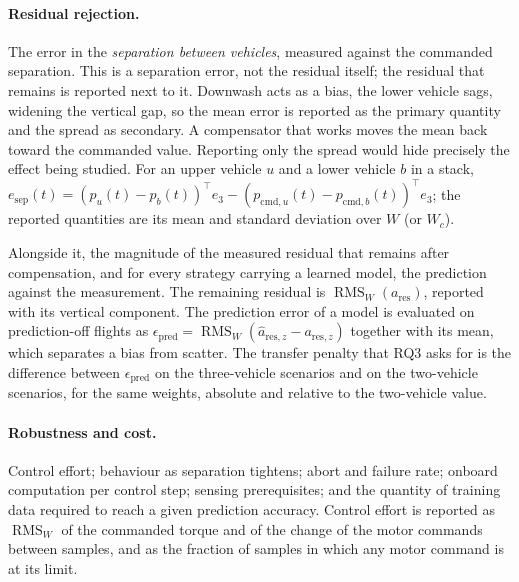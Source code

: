 \paragraph{Residual rejection.} The error in the \emph{separation between vehicles}, measured
against the commanded separation. This is a separation error, not the residual itself; the residual
that remains is reported next to it. Downwash acts as a bias, the lower vehicle sags, widening the
vertical gap, so the mean error is reported as the primary quantity and the spread as secondary. A
compensator that works moves the mean back toward the commanded value. Reporting only the spread
would hide precisely the effect being studied.
For an upper vehicle $u$ and a lower vehicle $b$ in a stack,
$e_{\mathrm{sep}}(t) = (p_u(t) - p_b(t))^\top e_3 - (p_{\mathrm{cmd},u}(t) - p_{\mathrm{cmd},b}(t))^\top e_3$;
the reported quantities are its mean and standard deviation over $W$ (or $W_c$).

Alongside it, the magnitude of the measured residual that remains after compensation, and for every
strategy carrying a learned model, the prediction against the measurement.
The remaining residual is $\operatorname{RMS}_W(a_{\mathrm{res}})$, reported with its vertical
component. The prediction error of a model is evaluated on prediction-off flights as
$\epsilon_{\mathrm{pred}} = \operatorname{RMS}_W(\hat a_{\mathrm{res},z} - a_{\mathrm{res},z})$ together
with its mean, which separates a bias from scatter. The transfer penalty that RQ3 asks for is the
difference between $\epsilon_{\mathrm{pred}}$ on the three-vehicle scenarios and on the two-vehicle
scenarios, for the same weights, absolute and relative to the two-vehicle value.

\paragraph{Robustness and cost.} Control effort; behaviour as separation tightens; abort and
failure rate; onboard computation per control step; sensing prerequisites; and the quantity of
training data required to reach a given prediction accuracy.
Control effort is reported as $\operatorname{RMS}_W$ of the commanded torque and of the change of
the motor commands between samples, and as the fraction of samples in which any motor command is
at its limit.

